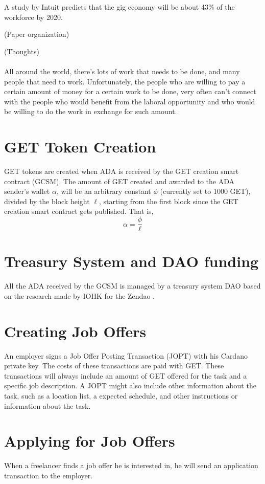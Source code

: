 \documentclass{article}
\begin{document}
A study by Intuit predicts that the gig economy will be about 43\% of the workforce by 2020.

(Paper organization)

(Thoughts)
\paragraph{} All around the world, there's lots of work that needs to be done, and many people that need to work. Unfortunately, the people who are willing to pay a certain amount of money for a certain work to be done, very often can't connect with the people who would benefit from the laboral opportunity and who would be willing to do the work in exchange for such amount.

\section{GET Token Creation}
GET tokens are created when ADA is received by the GET creation smart contract (GCSM).
The amount of GET created and awarded to the ADA sender's wallet $\alpha$, will be an arbitrary constant $\phi$ (currently set to 1000 GET), divided by the block height $\ell$, starting from the first block since the GET creation smart contract gets published. That is,
\[ \alpha
  = \dfrac{\phi}{\ell}
\]

\section{Treasury System and DAO funding}
All the ADA received by the GCSM is managed by a treasury system DAO based on the research made by IOHK for the Zendao \cite{zhangb2}.
 
\section{Creating Job Offers}
An employer signs a Job Offer Posting Transaction (JOPT) with his Cardano private key. The costs of these transactions are paid with GET. These transactions will always include an amount of GET offered for the task and a specific job description. A JOPT might also include other information about the task, such as a location list, a expected schedule, and other instructions or information about the task.

\section{Applying for Job Offers}
When a freelancer finds a job offer he is interested in, he will send an application transaction to the employer.
\end{document}
